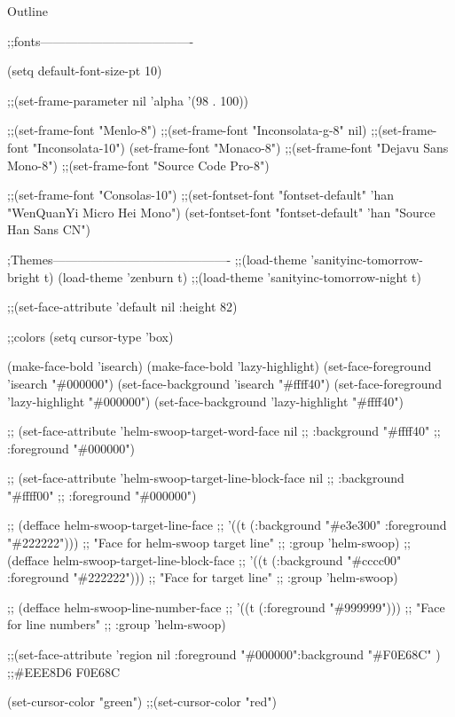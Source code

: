 \documentclass[presentation]{beamer}
\author{zhangtao}
\date{\today}
\title{}
\begin{document}
\begin{frame}{Outline}
\tableofcontents
\end{frame}

;;fonts-------------------------------------

(setq default-font-size-pt 10)

;;(set-frame-parameter nil 'alpha '(98 . 100))


;;(set-frame-font "Menlo-8")
;;(set-frame-font "Inconsolata-g-8" nil)
;;(set-frame-font "Inconsolata-10")
(set-frame-font "Monaco-8")
;;(set-frame-font "Dejavu Sans Mono-8")
;;(set-frame-font "Source Code Pro-8")


;;(set-frame-font "Consolas-10")
;;(set-fontset-font "fontset-default" 'han "WenQuanYi Micro Hei Mono")
(set-fontset-font "fontset-default" 'han "Source Han Sans CN")

;Themes-------------------------------------------
;;(load-theme 'sanityinc-tomorrow-bright t)
(load-theme 'zenburn t)
;;(load-theme 'sanityinc-tomorrow-night t)

;;(set-face-attribute 'default nil :height 82)

;;colors
(setq cursor-type 'box)

(make-face-bold 'isearch)
(make-face-bold 'lazy-highlight)
(set-face-foreground 'isearch "\#000000")
(set-face-background 'isearch "\#ffff40")
(set-face-foreground 'lazy-highlight "\#000000")
(set-face-background 'lazy-highlight "\#ffff40")

;; (set-face-attribute 'helm-swoop-target-word-face nil 
;;                     :background "\#ffff40"
;;                     :foreground "\#000000")

;; (set-face-attribute 'helm-swoop-target-line-block-face nil 
;;                     :background "\#ffff00"
;;                     :foreground "\#000000")

;; (defface helm-swoop-target-line-face
;;   '((t (:background "\#e3e300" :foreground "\#222222")))
;;   "Face for helm-swoop target line"
;;   :group 'helm-swoop)
;; (defface helm-swoop-target-line-block-face
;;   '((t (:background "\#cccc00" :foreground "\#222222")))
;;   "Face for target line"
;;   :group 'helm-swoop)

;; (defface helm-swoop-line-number-face
;;   '((t (:foreground "\#999999")))
;;   "Face for line numbers"
;;   :group 'helm-swoop)

;;(set-face-attribute 'region nil :foreground "\#000000":background "\#F0E68C" ) ;;\#EEE8D6 F0E68C

(set-cursor-color "green")
;;(set-cursor-color "red")
\end{document}
